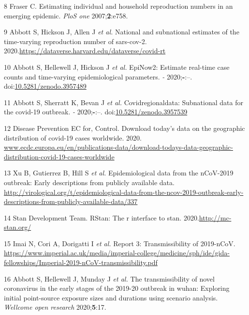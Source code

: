 \documentclass[
]{article}
\begin{document}
\leavevmode\hypertarget{ref-Fraser:2007hf}{}%
8 Fraser C. Estimating individual and household reproduction numbers in
an emerging epidemic. \emph{PloS one} 2007;\textbf{2}:e758.

\leavevmode\hypertarget{ref-dataverse}{}%
9 Abbott S, Hickson J, Allen J \emph{et al.} National and subnational
estimates of the time-varying reproduction number of sars-cov-2.
2020.\url{https://dataverse.harvard.edu/dataverse/covid-rt}

\leavevmode\hypertarget{ref-epinow2}{}%
10 Abbott S, Hellewell J, Hickson J \emph{et al.} EpiNow2: Estimate
real-time case counts and time-varying epidemiological parameters.
\emph{-} 2020;\textbf{-}:--.
doi:\href{https://doi.org/10.5281/zenodo.3957489}{10.5281/zenodo.3957489}

\leavevmode\hypertarget{ref-covidregionaldata}{}%
11 Abbott S, Sherratt K, Bevan J \emph{et al.} Covidregionaldata:
Subnational data for the covid-19 outbreak. \emph{-} 2020;\textbf{-}:--.
doi:\href{https://doi.org/10.5281/zenodo.3957539}{10.5281/zenodo.3957539}

\leavevmode\hypertarget{ref-ecdc_data}{}%
12 Disease Prevention EC for, Control. Download today's data on the
geographic distribution of covid-19 cases worldwide. 2020.
\url{www.ecdc.europa.eu/en/publications-data/download-todays-data-geographic-distribution-covid-19-cases-worldwide}

\leavevmode\hypertarget{ref-kraemer2020epidemiological}{}%
13 Xu B, Gutierrez B, Hill S \emph{et al.} Epidemiological data from the
nCoV-2019 outbreak: Early descriptions from publicly available data.
\url{http://virological.org/t/epidemiological-data-from-the-ncov-2019-outbreak-early-descriptions-from-publicly-available-data/337}

\leavevmode\hypertarget{ref-rstan}{}%
14 Stan Development Team. RStan: The r interface to stan.
2020.\url{http://mc-stan.org/}

\leavevmode\hypertarget{ref-Imai:webreport3}{}%
15 Imai N, Cori A, Dorigatti I \emph{et al.} Report 3: Transmissibility
of 2019-nCoV.
\url{https://www.imperial.ac.uk/media/imperial-college/medicine/sph/ide/gida-fellowships/Imperial-2019-nCoV-transmissibility.pdf}

\leavevmode\hypertarget{ref-Abbott:2020hj}{}%
16 Abbott S, Hellewell J, Munday J \emph{et al.} The transmissibility of
novel coronavirus in the early stages of the 2019-20 outbreak in wuhan:
Exploring initial point-source exposure sizes and durations using
scenario analysis. \emph{Wellcome open research} 2020;\textbf{5}:17.
\end{document}
